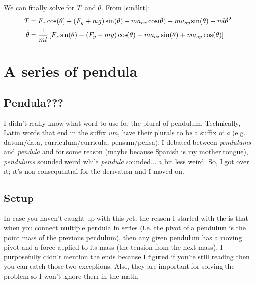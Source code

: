 \documentclass{article}
\begin{document}
We can finally solve for $T$ and $\ddot\theta$. From \cref{e:n3lrt}:
\begin{align}
  T&=
  F_x\cos(\theta)+\left(F_y+mg\right)\sin(\theta)-ma_{ox}\cos(\theta)-ma_{oy}\sin(\theta)-ml{\dot\theta}^2
  \label{e:t}
  \\
  \ddot\theta&=
  \frac{1}{ml}\left[
    F_x\sin(\theta)-\left(F_y+mg\right)\cos(\theta)-ma_{ox}\sin(\theta)+ma_{oy}\cos(\theta)
    \right]
  \label{e:ddt}
\end{align}

\section{A series of pendula}
\subsection{Pendula???}
I didn't really know what word to use for the plural of pendulum. Technically, Latin words that end in the suffix \emph{um}, have their plurals to be a suffix of \emph{a} (e.g. datum/data, curriculum/curricula, pensum/pensa). I debated between \emph{pendulums} and \emph{pendula} and for some reason (maybe because Spanish is my mother tongue), \emph{pendulums} sounded weird while \emph{pendula} sounded... a bit less weird. So, I got over it; it's non-consequential for the derivation and I moved on.

\subsection{Setup}
In case you haven't caught up with this yet, the reason I started with the \ntsp is that when you connect multiple pendula in series (i.e. the pivot of a pendulum is the point mass of the previous pendulum), then any given pendulum has a moving pivot and a force applied to its mass (the tension from the next mass). I purposefully didn't mention the ends because I figured if you're still reading then you can catch those two exceptions. Also, they are important for solving the problem so I won't ignore them in the math.
\end{document}
